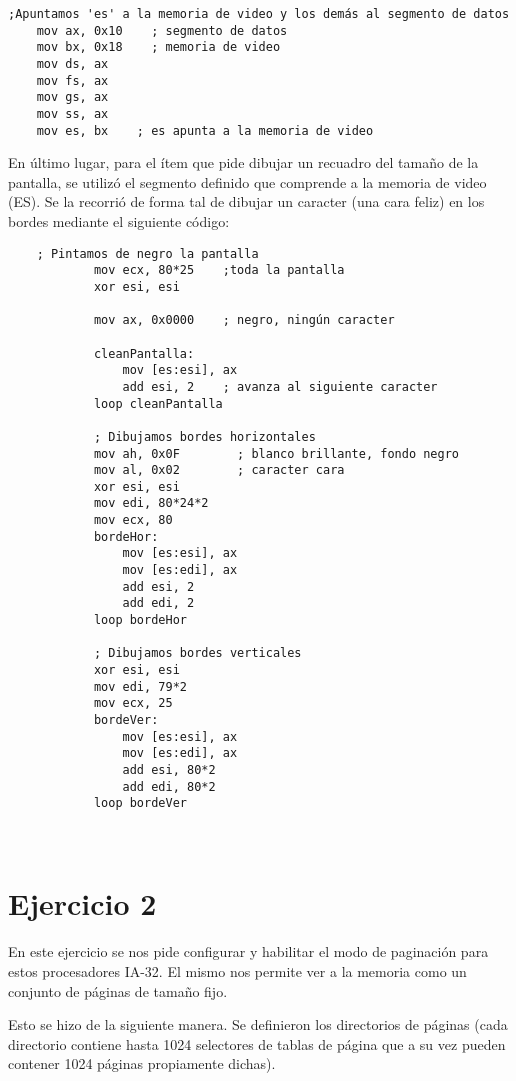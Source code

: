 \begin{verbatim}
;Apuntamos 'es' a la memoria de video y los demás al segmento de datos
	mov ax, 0x10    ; segmento de datos
	mov bx, 0x18    ; memoria de video
	mov ds, ax
	mov fs, ax
	mov gs, ax
	mov ss, ax
	mov es, bx    ; es apunta a la memoria de video

\end{verbatim}

En último lugar, para el ítem que pide dibujar un recuadro del tamaño de la pantalla, se utilizó el segmento definido que comprende a la memoria de video (ES). Se la recorrió de forma tal de dibujar un caracter (una cara feliz) en los bordes mediante el siguiente código:

\begin{verbatim}
    ; Pintamos de negro la pantalla
            mov ecx, 80*25    ;toda la pantalla
            xor esi, esi

            mov ax, 0x0000    ; negro, ningún caracter

            cleanPantalla:
                mov [es:esi], ax
                add esi, 2    ; avanza al siguiente caracter
            loop cleanPantalla

            ; Dibujamos bordes horizontales
            mov ah, 0x0F        ; blanco brillante, fondo negro
            mov al, 0x02        ; caracter cara
            xor esi, esi
            mov edi, 80*24*2
            mov ecx, 80
            bordeHor:
                mov [es:esi], ax
                mov [es:edi], ax
                add esi, 2
                add edi, 2
            loop bordeHor

            ; Dibujamos bordes verticales
            xor esi, esi
            mov edi, 79*2
            mov ecx, 25
            bordeVer:
                mov [es:esi], ax
                mov [es:edi], ax
                add esi, 80*2
                add edi, 80*2
            loop bordeVer

 
\end{verbatim}

\section{Ejercicio 2}

En este ejercicio se nos pide configurar y habilitar el modo de paginación para estos procesadores IA-32. El mismo nos permite ver a la memoria como un conjunto de páginas de tamaño fijo. 

Esto se hizo de la siguiente manera. Se definieron los directorios de páginas (cada directorio contiene hasta 1024 selectores de tablas de página que a su vez pueden contener 1024 páginas propiamente dichas). 

